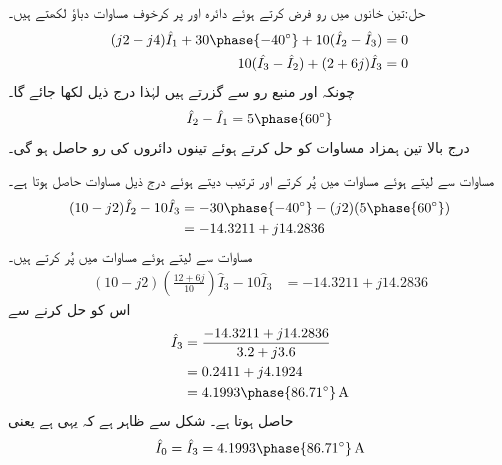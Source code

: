 حل:تین خانوں میں رو فرض کرتے ہوئے دائرہ  اور  پر  کرخوف مساوات دباؤ لکھتے ہیں۔
\begin{align}
(j2-j4)\hat{I}_1+30\phase{-40^{\circ}}+10(\hat{I}_2-\hat{I}_3)&=0 \label{مساوات_بدلتا_دائری_ترکیب_الف}\\
10(\hat{I_3}-\hat{I}_2)+(2+6j)\hat{I}_3&=0  \label{مساوات_بدلتا_دائری_ترکیب_ب}
\end{align} 
چونکہ  اور  منبع رو سے گزرتے ہیں لہٰذا درج ذیل لکھا جائے گا۔
\begin{align}
\hat{I}_2-\hat{I}_1=5\phase{60^{\circ}}  \label{مساوات_بدلتا_دائری_ترکیب_پ}
\end{align}
درج بالا تین ہمزاد مساوات کو حل کرتے ہوئے تینوں دائروں کی رو حاصل ہو گی۔

مساوات  سے  لیتے ہوئے مساوات  میں پُر کرتے اور ترتیب دیتے ہوئے درج ذیل مساوات حاصل ہوتا ہے۔
\begin{gather}
\begin{aligned} \label{مساوات_بدلتا_دائری_ترکیب_ت}
(10-j2)\hat{I}_2-10\hat{I}_3&=-30\phase{-40^{\circ}}-(j2)(5\phase{60^{\circ}})\\
&=-14.3211+j14.2836
\end{aligned}
\end{gather}
مساوات  سے  لیتے ہوئے مساوات  میں پُر کرتے ہیں۔
\begin{align*}
(10-j2)\left(\frac{12+6j}{10}\right)\hat{I}_3-10\hat{I}_3&=-14.3211+j14.2836
\end{align*}
اس کو حل کرنے سے
\begin{align*}
\hat{I}_3&=\frac{-14.3211+j14.2836}{3.2+j3.6}\\
&=0.2411+j4.1924\\
&=4.1993\phase{86.71^{\circ}}\,\si{\ampere}
\end{align*}
حاصل ہوتا ہے۔ شکل سے ظاہر ہے کہ یہی  ہے یعنی
\begin{align}
\hat{I}_0=\hat{I}_3=4.1993\phase{86.71^{\circ}}\,\si{\ampere}
\end{align}

